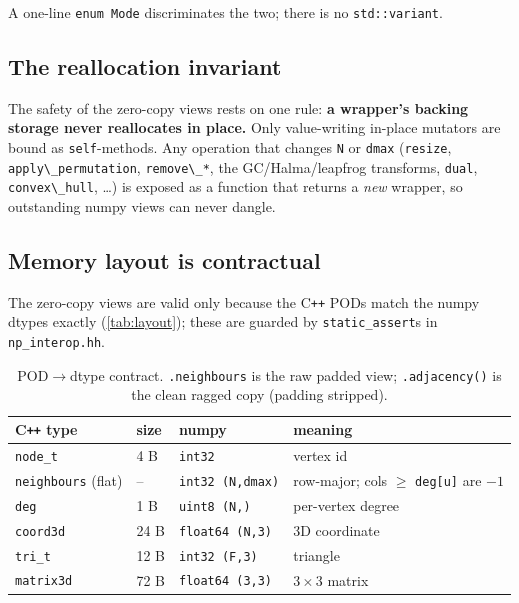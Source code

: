 \documentclass[11pt]{article}
\newcommand{\code}[1]{\lstinline[style=py]!#1!}
\begin{document}
A one-line \code{enum Mode} discriminates the two; there is no \texttt{std::variant}.

\subsection{The reallocation invariant}
The safety of the zero-copy views rests on one rule: \textbf{a wrapper's backing storage
never reallocates in place.} Only value-writing in-place mutators are bound as
\texttt{self}-methods. Any operation that changes \texttt{N} or \texttt{dmax}
(\code{resize}, \code{apply\_permutation}, \code{remove\_*}, the GC/Halma/leapfrog
transforms, \code{dual}, \code{convex\_hull}, \ldots) is exposed as a function that returns
a \emph{new} wrapper, so outstanding numpy views can never dangle.

\subsection{Memory layout is contractual}
The zero-copy views are valid only because the C\texttt{++} PODs match the numpy dtypes
exactly (\autoref{tab:layout}); these are guarded by \code{static_assert}s in
\texttt{np\_interop.hh}.

\begin{table}[h]
\centering\small
\begin{tabular}{@{}llll@{}}
\toprule
C\texttt{++} type & size & numpy & meaning \\
\midrule
\texttt{node\_t}            & 4 B  & \texttt{int32}            & vertex id \\
\texttt{neighbours} (flat)  & --   & \texttt{int32 (N,dmax)}   & row-major; cols $\ge$ \texttt{deg[u]} are $-1$ \\
\texttt{deg}                & 1 B  & \texttt{uint8 (N,)}       & per-vertex degree \\
\texttt{coord3d}            & 24 B & \texttt{float64 (N,3)}    & 3D coordinate \\
\texttt{tri\_t}             & 12 B & \texttt{int32 (F,3)}      & triangle \\
\texttt{matrix3d}           & 72 B & \texttt{float64 (3,3)}    & $3\times3$ matrix \\
\bottomrule
\end{tabular}
\caption{POD$\to$dtype contract. \code{.neighbours} is the raw padded view;
\code{.adjacency()} is the clean ragged copy (padding stripped).}
\label{tab:layout}
\end{table}
\end{document}
